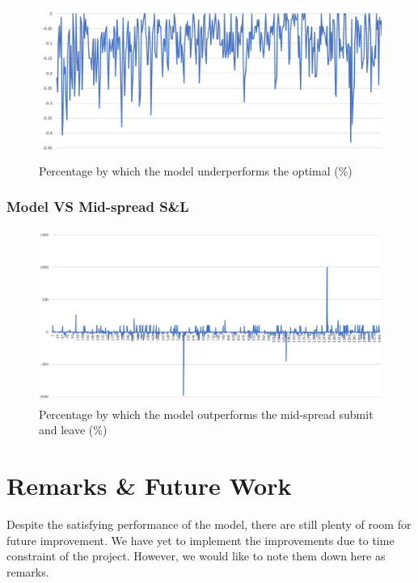 \documentclass[12pt]{extarticle}
\begin{document}
\begin{figure}[h]
\centering
\includegraphics[width=\textwidth]{optimal}
\caption{Percentage by which the model underperforms the optimal (\%)}
\label{optimal}
\end{figure}

\subsubsection{Model VS Mid-spread S\&L}

\begin{figure}[h]
\centering
\includegraphics[width=\textwidth]{midspread}
\caption{Percentage by which the model outperforms the mid-spread submit and leave (\%)}
\label{midspread}
\end{figure}

\section{Remarks \& Future Work}
Despite the satisfying performance of the model, there are still plenty of room
for future improvement. We have yet to implement the improvements due to time constraint
of the project. However, we would like to note them down here as remarks.
\end{document}
